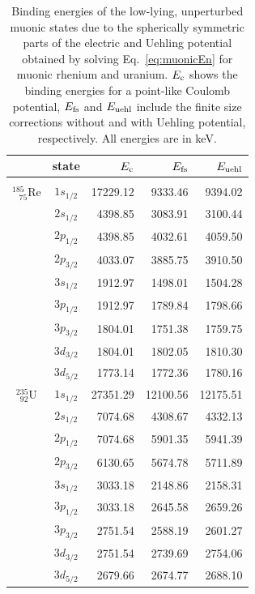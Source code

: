 \begin{table}[b]
\caption{\label{tab:monopole}%
Binding energies of the low-lying, unperturbed muonic states due to the spherically symmetric parts of the electric and Uehling potential obtained by solving Eq.~\eqref{eq:muonicEn} for muonic rhenium and uranium. $E_{\rm{c}}$ shows the binding energies for a point-like Coulomb potential, $E_{\rm{fs}}$ and $E_{\rm{uehl}}$ include the finite size corrections without and with Uehling potential, respectively. All energies are in keV.
}
\centering
\begin{tabular}{c|crrr}
& state & $E_{\rm{c}}$& $E_{\rm{fs}}$ &$E_{\rm{uehl}}$\\ \hline \\[-7pt]
$^{185}_{\phantom{m}75}$Re & $1s_{1/2}$ & 17229.12 & 9333.46 & 9394.02 \\
& $2s_{1/2}$ & 4398.85 & 3083.91 & 3100.44 \\
& $2p_{1/2}$ & 4398.85 & 4032.61 & 4059.50 \\
& $2p_{3/2}$ & 4033.07 & 3885.75 & 3910.50 \\
& $3s_{1/2}$ & 1912.97 & 1498.01 & 1504.28 \\
& $3p_{1/2}$ & 1912.97 & 1789.84 & 1798.66 \\
& $3p_{3/2}$ & 1804.01 & 1751.38 & 1759.75 \\
& $3d_{3/2}$ & 1804.01 & 1802.05 & 1810.30 \\
& $3d_{5/2}$ & 1773.14 & 1772.36 & 1780.16 \\[7pt]
$^{235}_{\phantom{1}92}$U&$1s_{1/2}$ & 27351.29 & 12100.56 & 12175.51 \\
& $2s_{1/2}$ & 7074.68 & 4308.67 & 4332.13 \\
& $2p_{1/2}$ & 7074.68 & 5901.35 & 5941.39 \\
& $2p_{3/2}$ & 6130.65 & 5674.78 & 5711.89 \\
& $3s_{1/2}$ & 3033.18 & 2148.86 & 2158.31 \\
& $3p_{1/2}$ & 3033.18 & 2645.58 & 2659.26 \\
& $3p_{3/2}$ & 2751.54 & 2588.19 & 2601.27 \\
& $3d_{3/2}$ & 2751.54 & 2739.69 & 2754.06 \\
& $3d_{5/2}$ & 2679.66 & 2674.77 & 2688.10

\end{tabular}
\end{table}
